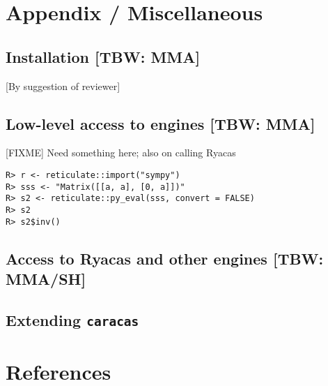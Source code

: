 \hypertarget{appendix-miscellaneous}{%
\section{Appendix / Miscellaneous}\label{appendix-miscellaneous}}

\hypertarget{installation-tbw-mma}{%
\subsection{Installation {[}TBW: MMA{]}}\label{installation-tbw-mma}}

{[}By suggestion of reviewer{]}

\hypertarget{low-level-access-to-engines-tbw-mma}{%
\subsection{Low-level access to engines {[}TBW: MMA{]}}\label{low-level-access-to-engines-tbw-mma}}

{[}FIXME{]} Need something here; also on calling Ryacas

\begin{verbatim}
R> r <- reticulate::import("sympy") 
R> sss <- "Matrix([[a, a], [0, a]])" 
R> s2 <- reticulate::py_eval(sss, convert = FALSE) 
R> s2 
R> s2$inv() 
\end{verbatim}

\hypertarget{access-to-ryacas-and-other-engines-tbw-mmash}{%
\subsection{Access to Ryacas and other engines {[}TBW: MMA/SH{]}}\label{access-to-ryacas-and-other-engines-tbw-mmash}}

\hypertarget{extending-caracas}{%
\subsection{\texorpdfstring{Extending \texttt{caracas}}{Extending caracas}}\label{extending-caracas}}

\hypertarget{references}{%
\section*{References}\label{references}}

